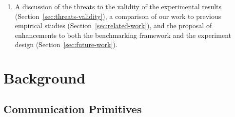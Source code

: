 \documentclass{sig-alternate}
\begin{document}
\begin{enumerate}
\begin{enumerate}
\end{enumerate}


\item A discussion of the threats to the validity of the experimental
  results (Section~\ref{sec:threats-validity}), a comparison of our
  work to previous empirical studies (Section~\ref{sec:related-work}),
  and the proposal of enhancements to both the benchmarking framework
  and the experiment design (Section~\ref{sec:future-work}).

\end{enumerate}



\section{Background}
\label{sec:background}

\subsection{Communication Primitives}
\label{sec:comm-prim}




\end{document}
